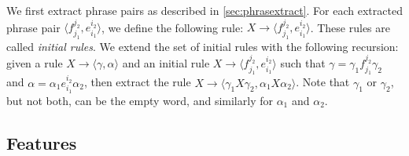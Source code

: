   We first extract phrase pairs as described in \autoref{sec:phrasextract}.
  For each extracted phrase pair $\langle f_{j_1}^{j_2}, e_{i_1}^{i_2} \rangle$,
  we define the following
  rule: $X \rightarrow \langle f_{j_1}^{j_2},e_{i_1}^{i_2} \rangle$.
  These rules are called {\em initial rules}.
      We extend the set of initial rules with the following recursion: given a rule  $X \rightarrow \langle \gamma, \alpha \rangle$
      and an initial rule $X \rightarrow \langle f_{j_1}^{j_2},e_{i_1}^{i_2} \rangle$ such that $\gamma = \gamma_1 f_{j_1}^{j_2} \gamma_2$
      and $\alpha = \alpha_1 e_{i_1}^{i_2} \alpha_2$, then extract the rule $X \rightarrow \langle \gamma_1 X \gamma_2, \alpha_1 X \alpha_2 \rangle$.
      Note that $\gamma_1$ or $\gamma_2$, but not both, can be the empty word, and similarly for $\alpha_1$ and $\alpha_2$.

%
%
%


\subsection{Features}
\label{sec:features}

